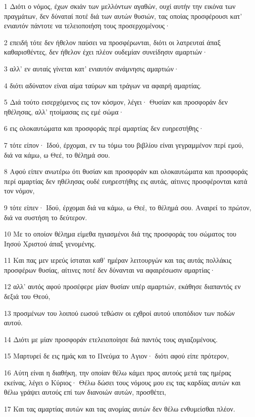 \par 1 Διότι ο νόμος, έχων σκιάν των μελλόντων αγαθών, ουχί αυτήν την εικόνα των πραγμάτων, δεν δύναταί ποτέ διά των αυτών θυσιών, τας οποίας προσφέρουσι κατ' ενιαυτόν πάντοτε να τελειοποιήση τους προσερχομένους·
\par 2 επειδή τότε δεν ήθελον παύσει να προσφέρωνται, διότι οι λατρευταί άπαξ καθαρισθέντες, δεν ήθελον έχει πλέον ουδεμίαν συνείδησιν αμαρτιών·
\par 3 αλλ' εν αυταίς γίνεται κατ' ενιαυτόν ανάμνησις αμαρτιών·
\par 4 διότι αδύνατον είναι αίμα ταύρων και τράγων να αφαιρή αμαρτίας.
\par 5 Διά τούτο εισερχόμενος εις τον κόσμον, λέγει· Θυσίαν και προσφοράν δεν ηθέλησας, αλλ' ητοίμασας εις εμέ σώμα·
\par 6 εις ολοκαυτώματα και προσφοράς περί αμαρτίας δεν ευηρεστήθης·
\par 7 τότε είπον· Ιδού, έρχομαι, εν τω τόμω του βιβλίου είναι γεγραμμένον περί εμού, διά να κάμω, ω Θεέ, το θέλημά σου.
\par 8 Αφού είπεν ανωτέρω ότι θυσίαν και προσφοράν και ολοκαυτώματα και προσφοράς περί αμαρτίας δεν ηθέλησας ουδέ ευηρεστήθης εις αυτάς, αίτινες προσφέρονται κατά τον νόμον,
\par 9 τότε είπεν· Ιδού, έρχομαι διά να κάμω, ω Θεέ, το θέλημά σου. Αναιρεί το πρώτον, διά να συστήση το δεύτερον.
\par 10 Με το οποίον θέλημα είμεθα ηγιασμένοι διά της προσφοράς του σώματος του Ιησού Χριστού άπαξ γενομένης.
\par 11 Και πας μεν ιερεύς ίσταται καθ' ημέραν λειτουργών και τας αυτάς πολλάκις προσφέρων θυσίας, αίτινες ποτέ δεν δύνανται να αφαιρέσωσιν αμαρτίας·
\par 12 αλλ' αυτός αφού προσέφερε μίαν θυσίαν υπέρ αμαρτιών, εκάθησε διαπαντός εν δεξιά του Θεού,
\par 13 προσμένων του λοιπού εωσού τεθώσιν οι εχθροί αυτού υποπόδιον των ποδών αυτού.
\par 14 Διότι με μίαν προσφοράν ετελειοποίησε διά παντός τους αγιαζομένους.
\par 15 Μαρτυρεί δε εις ημάς και το Πνεύμα το Αγιον· διότι αφού είπε πρότερον,
\par 16 Αύτη είναι η διαθήκη, την οποίαν θέλω κάμει προς αυτούς μετά τας ημέρας εκείνας, λέγει ο Κύριος· Θέλω δώσει τους νόμους μου εις τας καρδίας αυτών και θέλω γράψει αυτούς επί των διανοιών αυτών, προσθέτει,
\par 17 Και τας αμαρτίας αυτών και τας ανομίας αυτών δεν θέλω ενθυμείσθαι πλέον.
